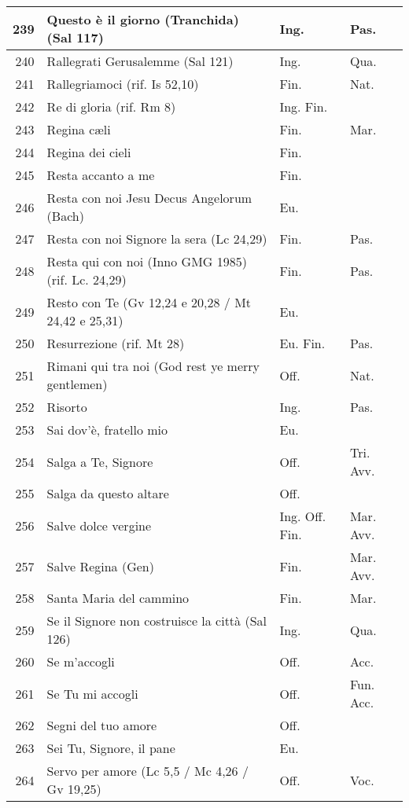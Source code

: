 {\begin{center}
\begin{longtable}{ | r | m{4.7cm} | m{1.8cm} | m{2cm}  |}
    239 & Questo è il giorno (Tranchida) (Sal 117) & Ing. & Pas.\\ \hline
    240 & Rallegrati Gerusalemme (Sal 121) & Ing. & Qua.\\ \hline
    241 & Rallegriamoci (rif. Is 52,10) & Fin. & Nat.\\ \hline
    242 & Re di gloria (rif. Rm 8) & Ing. Fin. & \\ \hline
    243 & Regina c\ae li & Fin. & Mar.\\ \hline
    244 & Regina dei cieli & Fin. & \\ \hline
    245 & Resta accanto a me & Fin. & \\ \hline
    246 & Resta con noi Jesu Decus Angelorum (Bach) & Eu. & \\ \hline
    247 & Resta con noi Signore la sera (Lc 24,29) & Fin. & Pas.\\ \hline
    248 & Resta qui con noi (Inno GMG 1985) (rif. Lc. 24,29) & Fin. & Pas.\\ \hline
    249 & Resto con Te (Gv 12,24 e 20,28 / Mt 24,42 e 25,31) & Eu. & \\ \hline
    250 & Resurrezione (rif. Mt 28) & Eu. Fin. & Pas.\\ \hline
    251 & Rimani qui tra noi (God rest ye merry gentlemen) & Off. & Nat.\\ \hline
    252 & Risorto & Ing. & Pas.\\ \hline
    253 & Sai dov'è, fratello mio & Eu. & \\ \hline
    254 & Salga a Te, Signore & Off. & Tri. Avv.\\ \hline
    255 & Salga da questo altare & Off. & \\ \hline
    256 & Salve dolce vergine & Ing. Off. Fin. & Mar. Avv.\\ \hline
    257 & Salve Regina (Gen) & Fin. & Mar. Avv.\\ \hline
    258 & Santa Maria del cammino & Fin. & Mar.\\ \hline
    259 & Se il Signore non costruisce la città (Sal 126) & Ing. & Qua.\\ \hline
    260 & Se m'accogli & Off. & Acc.\\ \hline
    261 & Se Tu mi accogli & Off. & Fun. Acc.\\ \hline
    262 & Segni del tuo amore & Off. & \\ \hline
    263 & Sei Tu, Signore, il pane & Eu. & \\ \hline
    264 & Servo per amore (Lc 5,5 / Mc 4,26 / Gv 19,25) & Off. & Voc.\\ \hline

\end{longtable}
\end{center}}
